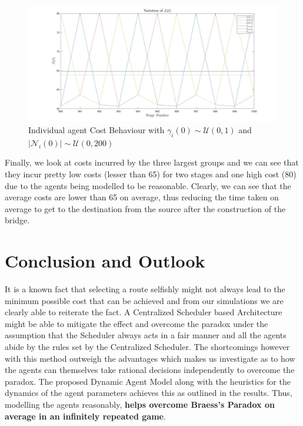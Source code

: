 \documentclass[11pt, letterpaper]{article}
\begin{document}
\begin{figure}[htbp]
    \centering
    \includegraphics[width=\linewidth]{images/results_distributed_player_cost.jpg}
    \caption{Individual agent Cost Behaviour with $\gamma_i(0) \sim \mathcal{U}(0,1)$ and $|\mathcal{N}_i(0)| \sim \mathcal{U}(0,200)$}
    \label{fig:results_distributed_player_cost}
\end{figure}

Finally, we look at costs incurred by the three largest groups and we can see that they incur pretty low costs (lesser than 65) for two stages and one high cost (80) due to the agents being modelled to be reasonable. Clearly, we can see that the average costs are lower than 65 on average, thus reducing the time taken on average to get to the destination from the source after the construction of the bridge. 

\section{Conclusion and Outlook}
It is a known fact that selecting a route selfishly might not always lead to the minimum possible cost that can be achieved and from our simulations we are clearly able to reiterate the fact. A Centralized Scheduler based Architecture might be able to mitigate the effect and overcome the paradox under the assumption that the Scheduler always acts in a fair manner and all the agents abide by the rules set by the Centralized Scheduler. The shortcomings however with this method outweigh the advantages which makes us investigate as to how the agents can themselves take rational decisions independently to overcome the paradox. The proposed Dynamic Agent Model along with the heuristics for the dynamics of the agent parameters achieves this as outlined in the results. Thus, modelling the agents reasonably, \textbf{helps overcome Braess's Paradox on average in an infinitely repeated game}.
\end{document}
